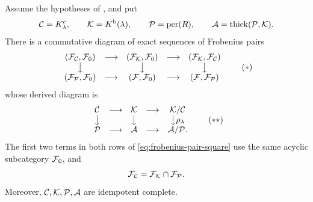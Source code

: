 \begin{lemma}\label{lem:negative-k-models}
Assume the hypotheses of , and put
\[
 \mathcal C=K^c_\lambda,\qquad
 \mathcal K=K^{\mathrm b}(\lambda),\qquad
 \mathcal P=\operatorname{per}(R),\qquad
 \mathcal A=\operatorname{thick}(\mathcal P,\mathcal K).
\]
There is a commutative diagram of exact sequences of Frobenius pairs
\[
\begin{array}{ccccc}
 (\mathcal F_{\mathcal C},\mathcal F_0)&\longrightarrow&(\mathcal F_{\mathcal K},\mathcal F_0)&\longrightarrow&(\mathcal F_{\mathcal K},\mathcal F_{\mathcal C})\\
 \big\downarrow&&\big\downarrow&&\big\downarrow\\
 (\mathcal F_{\mathcal P},\mathcal F_0)&\longrightarrow&(\mathcal F,\mathcal F_0)&\longrightarrow&(\mathcal F,\mathcal F_{\mathcal P})
\end{array}
\tag{\(*\)}\label{eq:frobenius-pair-square}
\]
whose derived diagram is
\[
\begin{array}{ccccc}
 \mathcal C&\longrightarrow&\mathcal K&\longrightarrow&\mathcal K/\mathcal C\\
 \big\downarrow&&\big\downarrow&&\big\downarrow\rho_\lambda\\
 \mathcal P&\longrightarrow&\mathcal A&\longrightarrow&\mathcal A/\mathcal P.
\end{array}
\tag{\(**\)}\label{eq:derived-quotient-square}
\]
The first two terms in both rows of \eqref{eq:frobenius-pair-square} use the same acyclic subcategory \(\mathcal F_0\), and
\[
 \mathcal F_{\mathcal C}=\mathcal F_{\mathcal K}\cap\mathcal F_{\mathcal P}.
\]
Moreover, \(\mathcal C,\mathcal K,\mathcal P,\mathcal A\) are idempotent complete.
\end{lemma}

